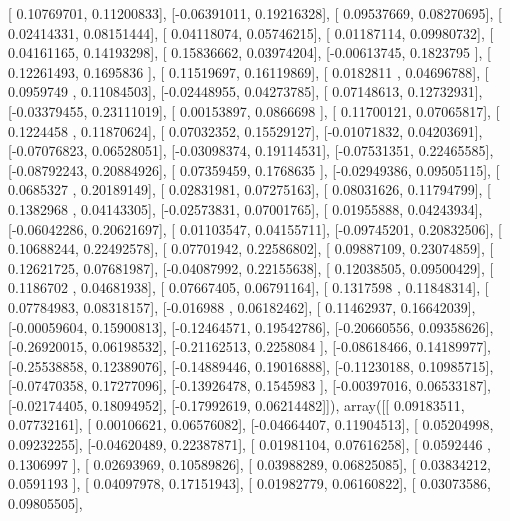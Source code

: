 \documentclass{article}
\begin{document}
       [ 0.10769701,  0.11200833],
       [-0.06391011,  0.19216328],
       [ 0.09537669,  0.08270695],
       [ 0.02414331,  0.08151444],
       [ 0.04118074,  0.05746215],
       [ 0.01187114,  0.09980732],
       [ 0.04161165,  0.14193298],
       [ 0.15836662,  0.03974204],
       [-0.00613745,  0.1823795 ],
       [ 0.12261493,  0.1695836 ],
       [ 0.11519697,  0.16119869],
       [ 0.0182811 ,  0.04696788],
       [ 0.0959749 ,  0.11084503],
       [-0.02448955,  0.04273785],
       [ 0.07148613,  0.12732931],
       [-0.03379455,  0.23111019],
       [ 0.00153897,  0.0866698 ],
       [ 0.11700121,  0.07065817],
       [ 0.1224458 ,  0.11870624],
       [ 0.07032352,  0.15529127],
       [-0.01071832,  0.04203691],
       [-0.07076823,  0.06528051],
       [-0.03098374,  0.19114531],
       [-0.07531351,  0.22465585],
       [-0.08792243,  0.20884926],
       [ 0.07359459,  0.1768635 ],
       [-0.02949386,  0.09505115],
       [ 0.0685327 ,  0.20189149],
       [ 0.02831981,  0.07275163],
       [ 0.08031626,  0.11794799],
       [ 0.1382968 ,  0.04143305],
       [-0.02573831,  0.07001765],
       [ 0.01955888,  0.04243934],
       [-0.06042286,  0.20621697],
       [ 0.01103547,  0.04155711],
       [-0.09745201,  0.20832506],
       [ 0.10688244,  0.22492578],
       [ 0.07701942,  0.22586802],
       [ 0.09887109,  0.23074859],
       [ 0.12621725,  0.07681987],
       [-0.04087992,  0.22155638],
       [ 0.12038505,  0.09500429],
       [ 0.1186702 ,  0.04681938],
       [ 0.07667405,  0.06791164],
       [ 0.1317598 ,  0.11848314],
       [ 0.07784983,  0.08318157],
       [-0.016988  ,  0.06182462],
       [ 0.11462937,  0.16642039],
       [-0.00059604,  0.15900813],
       [-0.12464571,  0.19542786],
       [-0.20660556,  0.09358626],
       [-0.26920015,  0.06198532],
       [-0.21162513,  0.2258084 ],
       [-0.08618466,  0.14189977],
       [-0.25538858,  0.12389076],
       [-0.14889446,  0.19016888],
       [-0.11230188,  0.10985715],
       [-0.07470358,  0.17277096],
       [-0.13926478,  0.1545983 ],
       [-0.00397016,  0.06533187],
       [-0.02174405,  0.18094952],
       [-0.17992619,  0.06214482]]), array([[ 0.09183511,  0.07732161],
       [ 0.00106621,  0.06576082],
       [-0.04664407,  0.11904513],
       [ 0.05204998,  0.09232255],
       [-0.04620489,  0.22387871],
       [ 0.01981104,  0.07616258],
       [ 0.0592446 ,  0.1306997 ],
       [ 0.02693969,  0.10589826],
       [ 0.03988289,  0.06825085],
       [ 0.03834212,  0.0591193 ],
       [ 0.04097978,  0.17151943],
       [ 0.01982779,  0.06160822],
       [ 0.03073586,  0.09805505],
\end{document}
